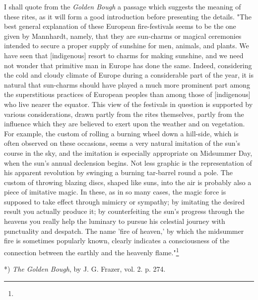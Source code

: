 \documentclass[a4paper, 11pt, oneside, polutonikogreek, english]{article}
\begin{document}
I shall quote from the \emph{Golden Bough} a passage which suggests the meaning of these rites, as it will form a good introduction before presenting the details. "The best general explanation of these European fire-festivals seems to be the one given by Mannhardt, namely, that they are sun-charms or magical ceremonies intended to secure a proper supply of sunshine for men, animals, and plants. We have seen that [indigenous] resort to charms for making sunshine, and we need not wonder that primitive man in Europe has done the same. Indeed, considering the cold and cloudy climate of Europe during a considerable part of the year, it is natural that sun-charms should have played a much more prominent part among the superstitious practices of European peoples than among those of [indigenous] who live nearer the equator. This view of the festivals in question is supported by various considerations, drawn partly from the rites themselves, partly from the influence which they are believed to exert upon the weather and on vegetation. For example, the custom of rolling a burning wheel down a hill-side, which is often observed on these occasions, seems a very natural imitation of the sun's course in the sky, and the imitation is especially appropriate on Midsummer Day, when the sun's annual declension begins. Not less graphic is the representation of his apparent revolution by swinging a burning tar-barrel round a pole. The custom of throwing blazing discs, shaped like suns, into the air is probably also a piece of imitative magic. In these, as in so many cases, the magic force is supposed to take effect through mimicry or sympathy; by imitating the desired result you actually produce it; by counterfeiting the sun's progress through the heavens you really help the luminary to pursue his celestial journey with punctuality and despatch. The name 'fire of heaven,' by which the midsummer fire is sometimes popularly known, clearly indicates a consciousness of the connection between the earthly and the heavenly flame."\footnote{}

*) \emph{The Golden Bough}, by J. G. Frazer, vol. 2. p. 274.
\end{document}
